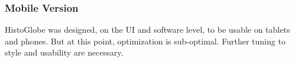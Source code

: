 \subsubsection{Mobile Version} %
\label{sub:mobile_version}
HistoGlobe was designed, on the UI and software level, to be usable on tablets and phones. But at this point, optimization is sub-optimal.
Further tuning to style and usability are necessary.






\newpage

